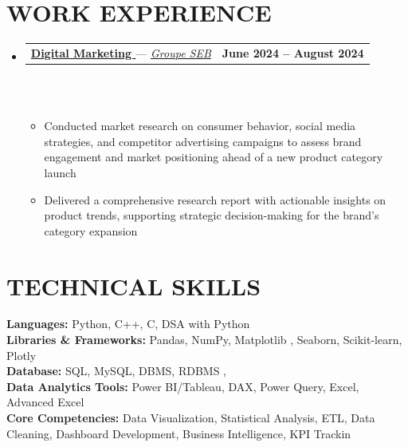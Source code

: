 \documentclass[letterpaper,11pt]{article}
\makeatletter
\newcommand{\resumeProjectHeading}[2]{
    \item
    \begin{tabular*}{1.001\textwidth}{l@{\extracolsep{\fill}}r}
      \small#1 & \textbf{\small #2}\\
    \end{tabular*}\vspace{-7pt}
}
\newcommand{\resumeSubHeadingListStart}{\begin{itemize}[leftmargin=0.0in, label={}]}
\newcommand{\resumeSubHeadingListEnd}{\end{itemize}}
\newcommand{\resumeItemListStart}{\begin{itemize}}
\newcommand{\resumeItemListEnd}{\end{itemize}\vspace{-5pt}}
\makeatother
\begin{document}
 






\section{WORK EXPERIENCE}
\vspace{-5pt}
\resumeSubHeadingListStart
    \vspace{5pt}
    \resumeProjectHeading
        {\textbf{\underline{\large{Digital Marketing }}} — \href{https://drive.google.com/file/d/10Qa4PXuYWBIqtKf0q8U3ZDNPDth6nIrT/view?usp=drive_link}{\textit{\normalsize{Groupe SEB}}}} {June 2024 – August 2024}\\
        \
    \resumeItemListStart
        \begin{itemize}[leftmargin=0.3cm, label=\textbullet, itemsep=1pt]
            \item Conducted market research on consumer behavior, social media strategies, and competitor advertising campaigns to assess brand engagement and market positioning ahead of a new product category launch
            \item Delivered a comprehensive research report with actionable insights on product trends, supporting strategic decision-making for the brand's category expansion
        
        \end{itemize}
    \resumeItemListEnd
\vspace{-5pt}
\resumeSubHeadingListEnd


\section{TECHNICAL SKILLS}
 \begin{itemize}[leftmargin=0.15in, label={}]
    \small{\item{
     \textbf{\normalsize{Languages:}}{  \normalsize{ Python, C++, C, DSA with Python }} \\
     \textbf{\normalsize{Libraries & Frameworks:}}{  \normalsize{ Pandas, NumPy, Matplotlib , Seaborn, Scikit-learn, Plotly}} \\
     \textbf{\normalsize{Database:}}{  \normalsize{SQL, MySQL, DBMS, RDBMS , }} \\
     \textbf{\normalsize{Data Analytics Tools:}}{  \normalsize{  Power BI/Tableau, DAX, Power Query, Excel, Advanced Excel}} \\
     \textbf{\normalsize{Core Competencies:}}{  \normalsize{ Data Visualization, Statistical Analysis, ETL, Data Cleaning, Dashboard Development, Business Intelligence, KPI Trackin }} \\
    }}
 \end{itemize}
 \vspace{-15pt}
\end{document}
